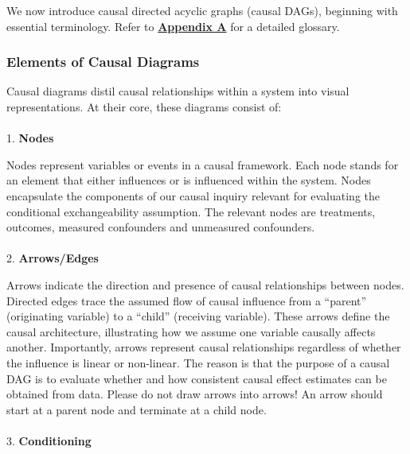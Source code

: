 \documentclass[
  singlecolumn]{article}
\makeatletter
\let\oldparagraph\paragraph
\renewcommand{\paragraph}{
    \@ifstar
      \xxxParagraphStar
      \xxxParagraphNoStar
  }
\newcommand{\xxxParagraphStar}[1]{\oldparagraph*{#1}\mbox{}}
\newcommand{\xxxParagraphNoStar}[1]{\oldparagraph{#1}\mbox{}}
\makeatother
\begin{document}
We now introduce causal directed acyclic graphs (causal DAGs), beginning
with essential terminology. Refer to
\hyperref[appendix-a]{\textbf{Appendix A}} for a detailed glossary.

\subsubsection{Elements of Causal
Diagrams}\label{elements-of-causal-diagrams}

Causal diagrams distil causal relationships within a system into visual
representations. At their core, these diagrams consist of:

\paragraph{\texorpdfstring{1. \textbf{Nodes}}{1. Nodes}}\label{nodes}

Nodes represent variables or events in a causal framework. Each node
stands for an element that either influences or is influenced within the
system. Nodes encapsulate the components of our causal inquiry relevant
for evaluating the conditional exchangeability assumption. The relevant
nodes are treatments, outcomes, measured confounders and unmeasured
confounders.

\paragraph{\texorpdfstring{2.
\textbf{Arrows/Edges}}{2. Arrows/Edges}}\label{arrowsedges}

Arrows indicate the direction and presence of causal relationships
between nodes. Directed edges trace the assumed flow of causal influence
from a ``parent'' (originating variable) to a ``child'' (receiving
variable). These arrows define the causal architecture, illustrating how
we assume one variable causally affects another. Importantly, arrows
represent causal relationships regardless of whether the influence is
linear or non-linear. The reason is that the purpose of a causal DAG is
to evaluate whether and how consistent causal effect estimates can be
obtained from data. Please do not draw arrows into arrows! An arrow
should start at a parent node and terminate at a child node.

\paragraph{\texorpdfstring{3.
\textbf{Conditioning}}{3. Conditioning}}\label{conditioning}
\end{document}
